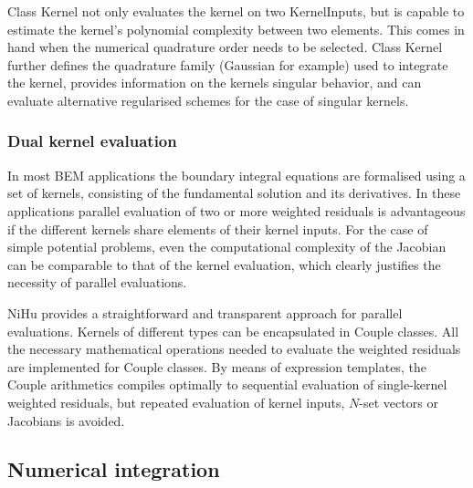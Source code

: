 \documentclass[review]{elsarticle}
\begin{document}
Class Kernel not only evaluates the kernel on two KernelInputs, but is capable to estimate the kernel's polynomial complexity between two elements.
This comes in hand when the numerical quadrature order needs to be selected.
Class Kernel further defines the quadrature family (Gaussian for example) used to integrate the kernel, provides information on the kernels singular behavior, and can evaluate alternative regularised schemes for the case of singular kernels.


\subsubsection{Dual kernel evaluation}

In most BEM applications the boundary integral equations are formalised using a set of kernels, consisting of the fundamental solution and its derivatives.
In these applications parallel evaluation of two or more weighted residuals is advantageous if the different kernels share elements of their kernel inputs.
For the case of simple potential problems, even the computational complexity of the Jacobian can be comparable to that of the kernel evaluation, which clearly justifies the necessity of parallel evaluations.

NiHu provides a straightforward and transparent approach for parallel evaluations.
Kernels of different types can be encapsulated in Couple classes.
All the necessary mathematical operations needed to evaluate the weighted residuals are implemented for Couple classes.
By means of expression templates, the Couple arithmetics compiles optimally to sequential evaluation of single-kernel weighted residuals, but repeated evaluation of kernel inputs, $N$-set vectors or Jacobians is avoided.

\subsection{Numerical integration}





\end{document}
